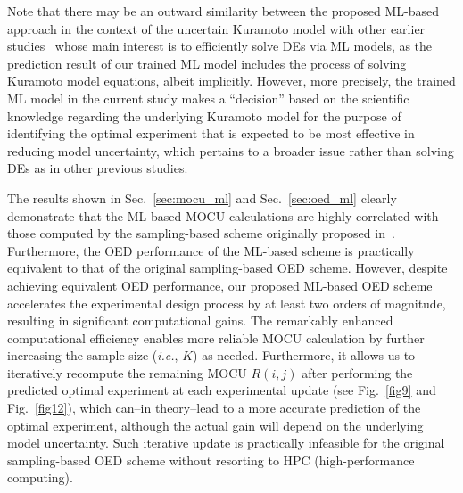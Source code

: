 \documentclass{article}
\begin{document}
Note that there may be an outward similarity between the proposed ML-based approach in the context of the uncertain Kuramoto model with other earlier studies~\cite{L712178, Han8505, RAISSI2019686} whose main interest is to efficiently solve DEs via ML models,  as the prediction result of our trained ML model includes the process of solving Kuramoto model equations, albeit implicitly. However, more precisely, the trained ML model in the current study makes a ``decision'' based on the scientific knowledge regarding the underlying Kuramoto model for the purpose of identifying the optimal experiment that is expected to be most effective in reducing model uncertainty, which pertains to a broader issue rather than solving DEs as in other previous studies.

The results shown in Sec.~\ref{sec:mocu_ml} and Sec.~\ref{sec:oed_ml} clearly demonstrate that the ML-based MOCU calculations are highly correlated with those computed by the sampling-based scheme originally proposed in~\cite{Hong2021}. Furthermore, the OED performance of the ML-based scheme is practically equivalent to that of the original sampling-based OED scheme. However, despite achieving equivalent OED performance, our proposed ML-based OED scheme accelerates the experimental design process by at least two orders of magnitude, resulting in significant computational gains. The remarkably enhanced computational efficiency enables more reliable MOCU calculation by further increasing the sample size (\textit{i.e.}, $K$) as needed. Furthermore, it allows us to iteratively recompute the remaining MOCU $R\left(i,j\right)$ after performing the predicted optimal experiment at each experimental update (see Fig.~\ref{fig9} and Fig.~\ref{fig12}), which can--in theory--lead to a more accurate prediction of the optimal experiment, although the actual gain will depend on the underlying model uncertainty. Such iterative update is practically infeasible for the original sampling-based OED scheme without resorting to HPC (high-performance computing).
\end{document}
